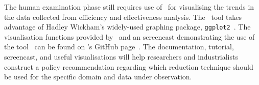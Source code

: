 The human examination phase still requires use of \mr~for visualising the trends in the data collected from efficiency
and effectiveness analysis. The \mr~tool takes advantage of Hadley Wickham's widely-used graphing package,
\texttt{ggplot2}~\cite{ggplot2}. The visualisation functions provided by \mr~and an screencast demonstrating the use of
the tool~\cite{asciinema} can be found on \mr's GitHub page~\cite{tool}. The documentation, tutorial, screencast, and
useful visualisations will help researchers and industrialists construct a policy recommendation regarding which
reduction technique should be used for the specific domain and data under observation.


